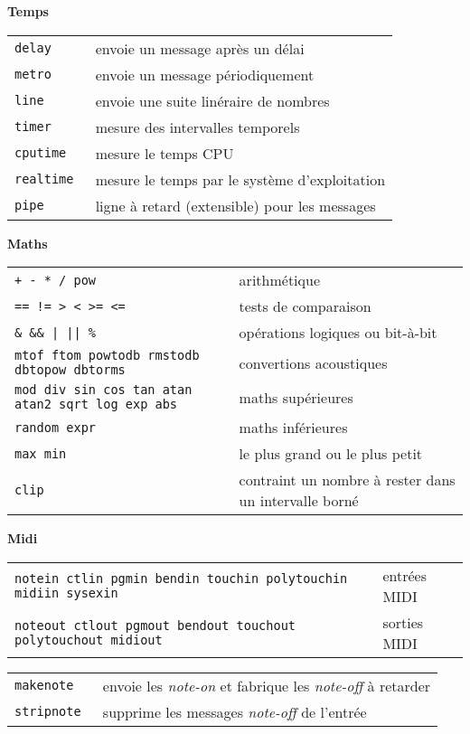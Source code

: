 \documentclass[a4paper, landscape, 10pt]{article}
\newcommand{\refcardtitle}[1]{
  \begin{center}
    \textbf{\small{#1}} %
  \end{center}
}
\begin{document}
\begin{multicols}{3}
  \refcardtitle{Temps}
  \begin{tabularx}{9cm}{>{\tt}l X}
    delay & envoie un message après un délai \\
    metro & envoie un message périodiquement \\
    line & envoie une suite linéraire de nombres \\
    timer & mesure des intervalles temporels \\
    cputime & mesure le temps CPU \\
    realtime & mesure le temps par le système d'exploitation \\
    pipe & ligne à retard (extensible) pour les messages \\
  \end{tabularx}

  \refcardtitle{Maths}
  \begin{tabularx}{9cm}{>{\tt}X X}
    + - * / pow  & arithmétique \\
    == != > < >= <= & tests de comparaison \\
    \& \&\& | || \% & opérations logiques ou bit-à-bit \\
    mtof ftom powtodb rmstodb dbtopow dbtorms & convertions acoustiques \\
    mod div sin cos tan atan atan2 sqrt log exp abs & maths supérieures \\
    random expr & maths inférieures \\ 
    max min & le plus grand ou le plus petit \\
    clip & contraint un nombre à rester dans un intervalle borné \\
  \end{tabularx}


  \refcardtitle{Midi}
  \begin{tabularx}{9cm}{>{\tt}X l}
    notein ctlin pgmin bendin touchin polytouchin midiin sysexin & entrées MIDI \\
    noteout ctlout pgmout bendout touchout polytouchout midiout & sorties MIDI \\
  \end{tabularx}
  \begin{tabularx}{9cm}{>{\tt}l X}
    makenote & envoie les \emph{note-on} et fabrique les \emph{note-off} à retarder \\
    stripnote & supprime les messages \emph{note-off} de l'entrée \\
  \end{tabularx}


\end{multicols}
\end{document}
